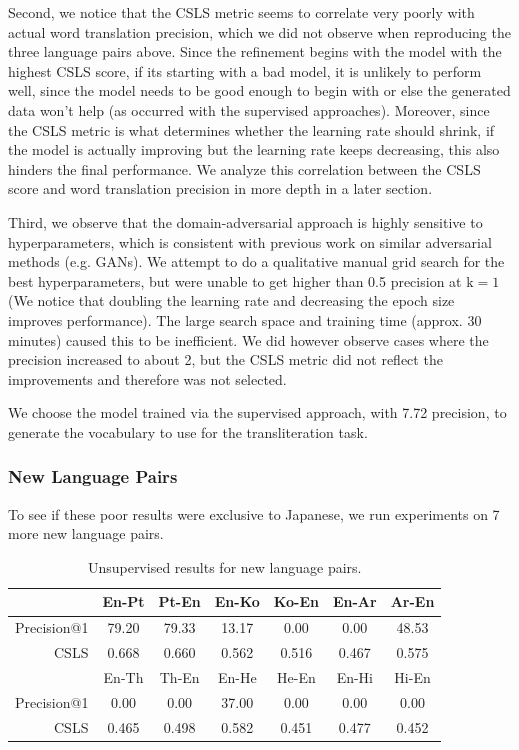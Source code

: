 \documentclass{article}
\begin{document}
Second, we notice that the CSLS metric seems to correlate very poorly
with actual word translation precision, which we did not observe when reproducing
the three language pairs above. Since the refinement begins with the model with
the highest CSLS score, if its starting with a bad model, it is unlikely to
perform well, since the model needs to be good enough to begin with or else the
generated data won't help (as occurred with the supervised approaches). Moreover,
since the CSLS metric is what determines whether the learning rate should shrink,
if the model is actually improving but the learning rate keeps decreasing, this
also hinders the final performance. We analyze this correlation between the CSLS
score and word translation precision in more depth in a later section.

Third, we observe that the domain-adversarial approach is highly sensitive to
hyperparameters, which is consistent with previous work on similar adversarial
methods (e.g. GANs). We attempt to do a qualitative manual grid search for
the best hyperparameters, but were unable to get higher than 0.5 precision at
$\text{k}=1$ (We notice that doubling the learning rate and decreasing the epoch
size improves performance). The large search space and training time (approx. 30 minutes)
caused this to be inefficient. We did however observe cases where the precision
increased to about 2, but the CSLS metric did not reflect the improvements and
therefore was not selected.

We choose the model trained via the supervised approach, with 7.72 precision, to
generate the vocabulary to use for the transliteration task.

\subsubsection*{New Language Pairs}

To see if these poor results were exclusive to Japanese, we run experiments
on 7 more new language pairs.

\begin{table}[h]
  \centering
  \begin{tabular}{r|cc|cc|cc}
    \toprule
    & En-Pt & Pt-En & En-Ko & Ko-En & En-Ar & Ar-En \\
    \midrule
    Precision@1 & 79.20 & 79.33 & 13.17 &  0.00 &  0.00 & 48.53 \\
    CSLS        & 0.668 & 0.660 & 0.562 & 0.516 & 0.467 & 0.575 \\
    \midrule
    \midrule
    & En-Th & Th-En & En-He & He-En & En-Hi & Hi-En \\
    \midrule
    Precision@1 &  0.00 &  0.00 & 37.00 &  0.00 &  0.00 &  0.00 \\
    CSLS        & 0.465 & 0.498 & 0.582 & 0.451 & 0.477 & 0.452 \\
    \bottomrule
  \end{tabular}
  \caption{Unsupervised results for new language pairs.}
\end{table}
\end{document}
